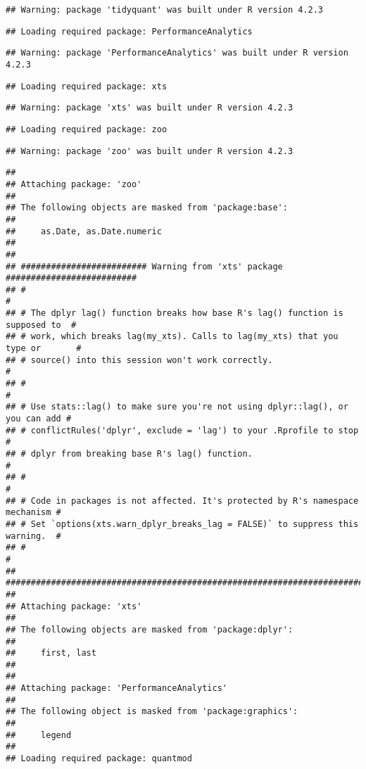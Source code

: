 \documentclass[
]{article}
\begin{document}
\begin{verbatim}
## Warning: package 'tidyquant' was built under R version 4.2.3
\end{verbatim}

\begin{verbatim}
## Loading required package: PerformanceAnalytics
\end{verbatim}

\begin{verbatim}
## Warning: package 'PerformanceAnalytics' was built under R version 4.2.3
\end{verbatim}

\begin{verbatim}
## Loading required package: xts
\end{verbatim}

\begin{verbatim}
## Warning: package 'xts' was built under R version 4.2.3
\end{verbatim}

\begin{verbatim}
## Loading required package: zoo
\end{verbatim}

\begin{verbatim}
## Warning: package 'zoo' was built under R version 4.2.3
\end{verbatim}

\begin{verbatim}
## 
## Attaching package: 'zoo'
## 
## The following objects are masked from 'package:base':
## 
##     as.Date, as.Date.numeric
## 
## 
## ######################### Warning from 'xts' package ##########################
## #                                                                             #
## # The dplyr lag() function breaks how base R's lag() function is supposed to  #
## # work, which breaks lag(my_xts). Calls to lag(my_xts) that you type or       #
## # source() into this session won't work correctly.                            #
## #                                                                             #
## # Use stats::lag() to make sure you're not using dplyr::lag(), or you can add #
## # conflictRules('dplyr', exclude = 'lag') to your .Rprofile to stop           #
## # dplyr from breaking base R's lag() function.                                #
## #                                                                             #
## # Code in packages is not affected. It's protected by R's namespace mechanism #
## # Set `options(xts.warn_dplyr_breaks_lag = FALSE)` to suppress this warning.  #
## #                                                                             #
## ###############################################################################
## 
## Attaching package: 'xts'
## 
## The following objects are masked from 'package:dplyr':
## 
##     first, last
## 
## 
## Attaching package: 'PerformanceAnalytics'
## 
## The following object is masked from 'package:graphics':
## 
##     legend
## 
## Loading required package: quantmod
\end{verbatim}
\end{document}
